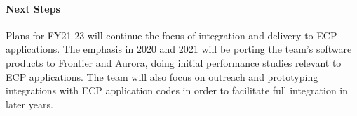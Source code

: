 \paragraph{Next Steps}

Plans for FY21-23 will continue the focus of integration and delivery to ECP applications. The emphasis in 2020 and 2021 will be porting the team’s software products to Frontier and Aurora, doing initial performance studies relevant to ECP applications. The team will also focus on outreach and prototyping integrations with ECP application codes in order to facilitate full integration in later years.

